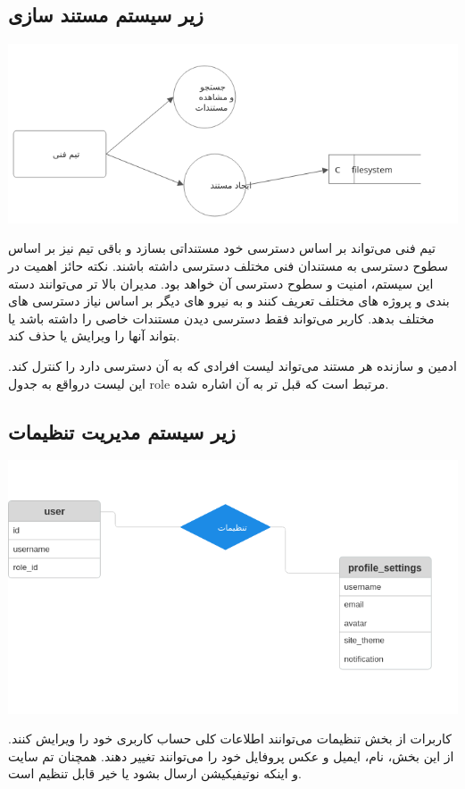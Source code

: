 \subsection{زیر سیستم مستند سازی}
\includegraphics[scale=0.8]{assets/doc_dfd.png}

تیم فنی می‌تواند بر اساس دسترسی خود مستنداتی بسازد و باقی تیم نیز بر اساس سطوح دسترسی به مستندان فنی مختلف دسترسی داشته باشند.
نکته حائز اهمیت در این سیستم، امنیت و سطوح دسترسی آن خواهد بود. مدیران بالا تر می‌توانند دسته بندی و پروژه های مختلف تعریف کنند و به نیرو های دیگر
بر اساس نیاز دسترسی های مختلف بدهد.
کاربر می‌تواند فقط دسترسی دیدن مستندات خاصی را داشته باشد یا بتواند آنها را ویرایش یا حذف کند.

ادمین و سازنده هر مستند می‌تواند لیست افرادی که به آن دسترسی دارد را کنترل کند. این لیست درواقع به جدول role مرتبط است که قبل تر به آن اشاره شده.

\subsection{زیر سیستم مدیریت تنظیمات}
\includegraphics[scale=0.8]{assets/settings_erd.png}

کاربرات از بخش تنظیمات می‌توانند اطلاعات کلی حساب کاربری خود را ویرایش کنند. از این بخش، نام، ایمیل و عکس پروفایل خود را می‌توانند تغییر دهند.
همچنان تم سایت و اینکه نوتیفیکیشن ارسال بشود یا خیر قابل تنظیم است.

